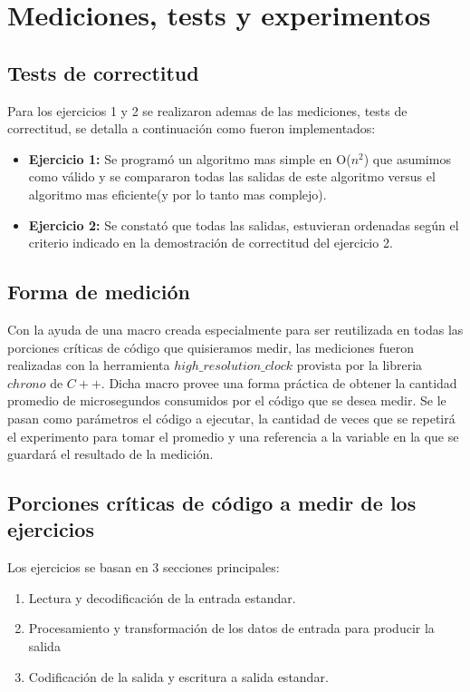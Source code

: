 \section{Mediciones, tests y experimentos}
\subsection{Tests de correctitud}
Para los ejercicios 1 y 2 se realizaron ademas de las mediciones, tests de correctitud, se detalla a continuaci\'on como fueron implementados:
\begin{itemize}
	\item \textbf{Ejercicio 1:} Se program\'o un algoritmo mas simple en O($n^2$) que asumimos como v\'alido y se compararon todas las salidas de este algoritmo versus el algoritmo mas eficiente(y por lo tanto mas complejo). 
	\item \textbf{Ejercicio 2:} Se constat\'o que todas las salidas, estuvieran ordenadas seg\'un el criterio indicado en la demostraci\'on de correctitud del ejercicio 2.
\end{itemize}

\subsection{Forma de medici\'on}
Con la ayuda de una macro creada especialmente para ser reutilizada en todas las porciones cr\'iticas de c\'odigo que quisieramos medir, las mediciones fueron realizadas con la herramienta $high\_resolution\_clock$ provista por la libreria $chrono$ de $C++$. Dicha macro provee una forma pr\'actica de obtener la cantidad promedio de microsegundos consumidos por el c\'odigo que se desea medir. Se le pasan como par\'ametros el c\'odigo a ejecutar, la cantidad de veces que se repetir\'a el experimento para tomar el promedio y una referencia a la variable en la que se guardar\'a el resultado de la medici\'on. 

\subsection{Porciones cr\'iticas de c\'odigo a medir de los ejercicios}
Los ejercicios se basan en 3 secciones principales:
\begin{enumerate}
	\item Lectura y decodificaci\'on de la entrada estandar.
	\item Procesamiento y transformaci\'on de los datos de entrada para producir la salida
	\item Codificaci\'on de la salida y escritura a salida estandar.
\end{enumerate}

